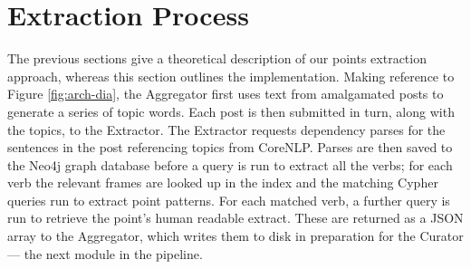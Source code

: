   \section{Extraction Process\label{sec:extract-process}}
    The previous sections give a theoretical description of our points extraction approach, whereas this section outlines the implementation. Making reference to Figure \ref{fig:arch-dia}, the Aggregator first uses text from amalgamated posts to generate a series of topic words. Each post is then submitted in turn, along with the topics, to the Extractor. The Extractor requests dependency parses for the sentences in the post referencing topics from CoreNLP. Parses are then saved to the Neo4j graph database before a query is run to extract all the verbs; for each verb the relevant frames are looked up in the index and the matching Cypher queries run to extract point patterns. For each matched verb, a further query is run to retrieve the point's human readable extract. These are returned as a JSON array to the Aggregator, which writes them to disk in preparation for the Curator --- the next module in the pipeline.
